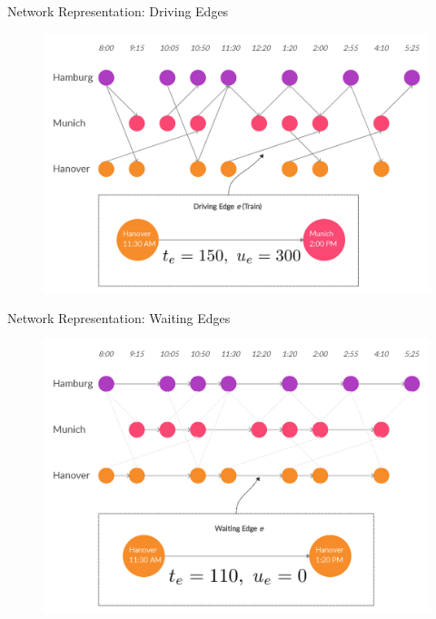 \documentclass[handout]{beamer}
\begin{document}
\begin{frame}{Network Representation: Driving Edges}
\begin{figure}
    \centering
    \includegraphics[scale=0.12]{Driving_Edges.jpg}
\end{figure}
\end{frame}

\begin{frame}{Network Representation: Waiting Edges}
\begin{figure}
    \centering
    \includegraphics[scale=0.12]{Waiting_Edges.jpg}
\end{figure}
\end{frame}
\end{document}
